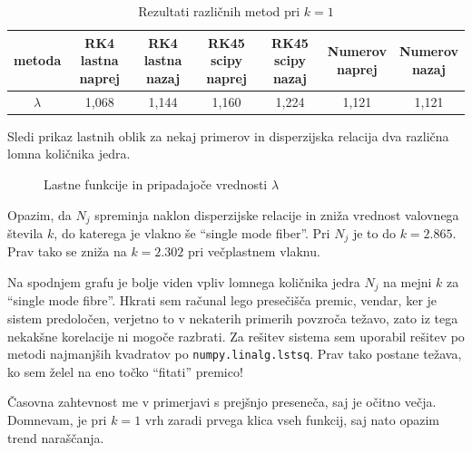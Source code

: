 \begin{table}[H]
    \begin{tabular}{c|c c c c c c}
        metoda & \shortstack{RK4 lastna\\naprej} & \shortstack{RK4 lastna\\nazaj} & \shortstack{RK45 scipy\\naprej} & \shortstack{RK45 scipy\\nazaj} & \shortstack{Numerov\\naprej} & \shortstack{Numerov\\nazaj} \\ \hline
        $\lambda$ & 1,068 & 1,144 & 1,160 & 1,224 & 1,121 & 1,121\\
    \end{tabular}
    \caption{Rezultati različnih metod pri $k=1$}
\end{table}

Sledi prikaz lastnih oblik za nekaj primerov in disperzijska relacija dva različna lomna količnika jedra.

\begin{figure}[H]
    \centering
    \caption{Lastne funkcije in pripadajoče vrednosti $\lambda$}
\end{figure}

Opazim, da $N_j$ spreminja naklon disperzijske relacije in zniža vrednost valovnega števila $k$, do katerega je vlakno še ``single mode fiber''. Pri $N_j$ je to do $k=2.865$. Prav tako se zniža na $k=2.302$ pri večplastnem vlaknu.


Na spodnjem grafu je bolje viden vpliv lomnega količnika jedra $N_j$ na mejni $k$ za ``single mode fibre''. Hkrati sem računal lego presečišča premic, vendar, ker je sistem predoločen, verjetno to v nekaterih primerih povzroča težavo, zato iz tega nekakšne korelacije ni mogoče razbrati. Za rešitev sistema sem uporabil rešitev po metodi najmanjših kvadratov po \texttt{numpy.linalg.lstsq}. Prav tako postane težava, ko sem želel na eno točko ``fitati'' premico!


Časovna zahtevnost me v primerjavi s prejšnjo preseneča, saj je očitno večja. Domnevam, je pri $k=1$ vrh zaradi prvega klica vseh funkcij, saj nato opazim trend naraščanja. 